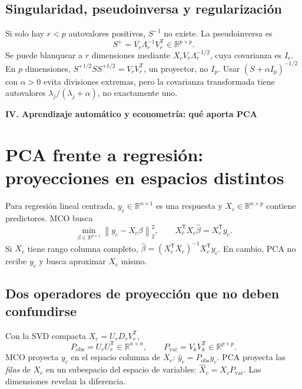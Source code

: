 \documentclass[11pt,a4paper]{article}
\newcommand{\R}{\mathbb R}
\newcommand{\T}{^{\mathsf T}}
\newcommand{\norm}[1]{\left\lVert #1\right\rVert}
\theoremstyle{definition}
\newcommand{\parte}[1]{\par\bigskip\Needspace{8\baselineskip}\begin{center}{\Large\bfseries\color{azul}#1}\end{center}}
\begin{document}
\subsection{Singularidad, pseudoinversa y regularización}
Si solo hay $r<p$ autovalores positivos, $S^{-1}$ no existe. La pseudoinversa es
\[
S^+=V_r\Lambda_r^{-1}V_r\T\in\R^{p\times p}.
\]
Se puede blanquear a $r$ dimensiones mediante $X_cV_r\Lambda_r^{-1/2}$, cuya covarianza es $I_r$. En $p$ dimensiones, $S^{+1/2}SS^{+1/2}=V_rV_r\T$, un proyector, no $I_p$. Usar $(S+\alpha I_p)^{-1/2}$ con $\alpha>0$ evita divisiones extremas, pero la covarianza transformada tiene autovalores $\lambda_j/(\lambda_j+\alpha)$, no exactamente uno.

\parte{IV. Aprendizaje automático y econometría: qué aporta PCA}
\section{PCA frente a regresión: proyecciones en espacios distintos}
Para regresión lineal centrada, $y_c\in\R^{n\times1}$ es una respuesta y $X_c\in\R^{n\times p}$ contiene predictores. MCO busca
\[
\min_{\beta\in\R^{p\times1}}\norm{y_c-X_c\beta}_2^2,
\qquad X_c\T X_c\widehat\beta=X_c\T y_c.
\]
Si $X_c$ tiene rango columna completo, $\widehat\beta=(X_c\T X_c)^{-1}X_c\T y_c$. En cambio, PCA no recibe $y_c$ y busca aproximar $X_c$ mismo.
\subsection{Dos operadores de proyección que no deben confundirse}
Con la SVD compacta $X_c=U_rD_rV_r\T$,
\[
P_{\mathrm{obs}}=U_rU_r\T\in\R^{n\times n},\qquad
P_{\mathrm{var}}=V_kV_k\T\in\R^{p\times p}.
\]
MCO proyecta $y_c$ en el espacio columna de $X_c$: $\widehat y_c=P_{\mathrm{obs}}y_c$. PCA proyecta las \emph{filas} de $X_c$ en un subespacio del espacio de variables: $\widehat X_c=X_cP_{\mathrm{var}}$. Las dimensiones revelan la diferencia.
\end{document}
